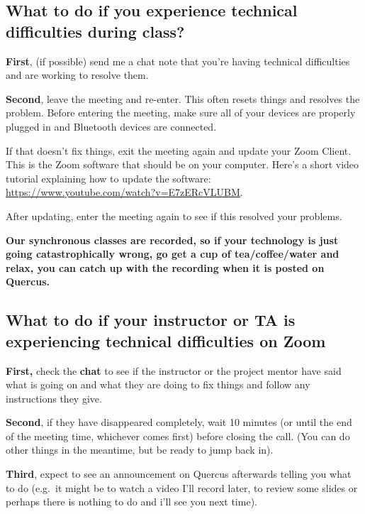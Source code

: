 \documentclass[
  openany]{book}
\begin{document}
\hypertarget{what-to-do-if-you-experience-technical-difficulties-during-class}{%
\subsection{What to do if you experience technical difficulties during class?}\label{what-to-do-if-you-experience-technical-difficulties-during-class}}

\textbf{First}, (if possible) send me a chat note that you're having technical difficulties and are working to resolve them.

\textbf{Second}, leave the meeting and re-enter. This often resets things and resolves the problem. Before entering the meeting, make sure all of your devices are properly plugged in and Bluetooth devices are connected.

If that doesn't fix things, exit the meeting again and update your Zoom Client. This is the Zoom software that should be on your computer. Here's a short video tutorial explaining how to update the software: \url{https://www.youtube.com/watch?v=E7zERcVLUBM}.

After updating, enter the meeting again to see if this resolved your problems.

\textbf{Our synchronous classes are recorded, so if your technology is just going catastrophically wrong, go get a cup of tea/coffee/water and relax, you can catch up with the recording when it is posted on Quercus.}

\hypertarget{what-to-do-if-your-instructor-or-ta-is-experiencing-technical-difficulties-on-zoom}{%
\subsection{What to do if your instructor or TA is experiencing technical difficulties on Zoom}\label{what-to-do-if-your-instructor-or-ta-is-experiencing-technical-difficulties-on-zoom}}

\textbf{First,} check the \textbf{chat} to see if the instructor or the project mentor have said what is going on and what they are doing to fix things and follow any instructions they give.

\textbf{Second}, if they have disappeared completely, wait 10 minutes (or until the end of the meeting time, whichever comes first) before closing the call. (You can do other things in the meantime, but be ready to jump back in).

\textbf{Third}, expect to see an announcement on Quercus afterwards telling you what to do (e.g.~it might be to watch a video I'll record later, to review some slides or perhaps there is nothing to do and i'll see you next time).
\end{document}
